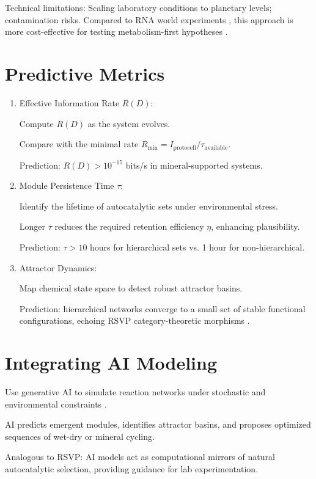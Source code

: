\documentclass[openany]{book}
\begin{document}
Technical limitations: Scaling laboratory conditions to planetary levels; contamination risks. Compared to RNA world experiments \citep{joyce1989}, this approach is more cost-effective for testing metabolism-first hypotheses \citep{martin2015}.

\section{Predictive Metrics}
\begin{enumerate}
\item Effective Information Rate $R(D)$:

Compute $R(D)$ as the system evolves.

Compare with the minimal rate $R_{\min} = I_{\text{protocell}} / \tau_{\text{available}}$.

Prediction: $R(D) > 10^{-15}$ bits/s in mineral-supported systems.

\item Module Persistence Time $\tau$:

Identify the lifetime of autocatalytic sets under environmental stress.

Longer $\tau$ reduces the required retention efficiency $\eta$, enhancing plausibility.

Prediction: $\tau > 10$ hours for hierarchical sets vs. 1 hour for non-hierarchical.

\item Attractor Dynamics:

Map chemical state space to detect robust attractor basins.

Prediction: hierarchical networks converge to a small set of stable functional configurations, echoing RSVP category-theoretic morphisms \citep{peng2020}.
\end{enumerate}

\section{Integrating AI Modeling}
Use generative AI to simulate reaction networks under stochastic and environmental constraints \citep{scalinghypothesis}.

AI predicts emergent modules, identifies attractor basins, and proposes optimized sequences of wet-dry or mineral cycling.

Analogous to RSVP: AI models act as computational mirrors of natural autocatalytic selection, providing guidance for lab experimentation.
\end{document}
